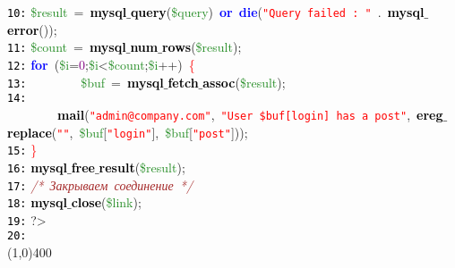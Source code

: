 \documentclass[a4paper,12pt]{article}
\begin{document}
\mbox{}\texttt{\textcolor{Black}{10:}} \textcolor{ForestGreen}{\$result}\ \textcolor{BrickRed}{=}\ \textbf{\textcolor{Black}{mysql$\_$query}}\textcolor{BrickRed}{(}\textcolor{ForestGreen}{\$query}\textcolor{BrickRed}{)}\ \textbf{\textcolor{Blue}{or}}\ \textbf{\textcolor{Blue}{die}}\textcolor{BrickRed}{(}\texttt{\textcolor{Red}{"{}Query\ failed\ :\ "{}}}\ \textcolor{BrickRed}{.}\ \textbf{\textcolor{Black}{mysql$\_$error}}\textcolor{BrickRed}{());} \\
\mbox{}\texttt{\textcolor{Black}{11:}} \textcolor{ForestGreen}{\$count}\ \textcolor{BrickRed}{=}\ \textbf{\textcolor{Black}{mysql$\_$num$\_$rows}}\textcolor{BrickRed}{(}\textcolor{ForestGreen}{\$result}\textcolor{BrickRed}{);} \\
\mbox{}\texttt{\textcolor{Black}{12:}} \textbf{\textcolor{Blue}{for}}\ \textcolor{BrickRed}{(}\textcolor{ForestGreen}{\$i}\textcolor{BrickRed}{=}\textcolor{Purple}{0}\textcolor{BrickRed}{;}\textcolor{ForestGreen}{\$i}\textcolor{BrickRed}{\textless{}}\textcolor{ForestGreen}{\$count}\textcolor{BrickRed}{;}\textcolor{ForestGreen}{\$i}\textcolor{BrickRed}{++)}\ \textcolor{Red}{\{} \\
\mbox{}\texttt{\textcolor{Black}{13:}} \ \ \ \ \ \ \ \ \textcolor{ForestGreen}{\$buf}\ \textcolor{BrickRed}{=}\ \textbf{\textcolor{Black}{mysql$\_$fetch$\_$assoc}}\textcolor{BrickRed}{(}\textcolor{ForestGreen}{\$result}\textcolor{BrickRed}{);} \\
\mbox{}\texttt{\textcolor{Black}{14:}} \ \ \ \ \ \ \ \ \textbf{\textcolor{Black}{mail}}\textcolor{BrickRed}{(}\texttt{\textcolor{Red}{"{}admin@company.com"{}}}\textcolor{BrickRed}{,}\ \texttt{\textcolor{Red}{"{}User\ \$buf[login]\ has\ a\ post"{}}}\textcolor{BrickRed}{,}\ \textbf{\textcolor{Black}{ereg$\_$replace}}\textcolor{BrickRed}{(}\texttt{\textcolor{Red}{"{}"{}}}\textcolor{BrickRed}{,}\ \textcolor{ForestGreen}{\$buf}\textcolor{BrickRed}{[}\texttt{\textcolor{Red}{"{}login"{}}}\textcolor{BrickRed}{],}\ \textcolor{ForestGreen}{\$buf}\textcolor{BrickRed}{[}\texttt{\textcolor{Red}{"{}post"{}}}\textcolor{BrickRed}{]));} \\
\mbox{}\texttt{\textcolor{Black}{15:}} \textcolor{Red}{\}} \\
\mbox{}\texttt{\textcolor{Black}{16:}} \textbf{\textcolor{Black}{mysql$\_$free$\_$result}}\textcolor{BrickRed}{(}\textcolor{ForestGreen}{\$result}\textcolor{BrickRed}{);} \\
\mbox{}\texttt{\textcolor{Black}{17:}} \textit{\textcolor{Brown}{/*\ Закрываем\ соединение\ */}} \\
\mbox{}\texttt{\textcolor{Black}{18:}} \textbf{\textcolor{Black}{mysql$\_$close}}\textcolor{BrickRed}{(}\textcolor{ForestGreen}{\$link}\textcolor{BrickRed}{);} \\
\mbox{}\texttt{\textcolor{Black}{19:}} \textcolor{BrickRed}{?\textgreater{}} \\
\mbox{}\texttt{\textcolor{Black}{20:}} 
\\
\line(1,0){400}
\end{document}
